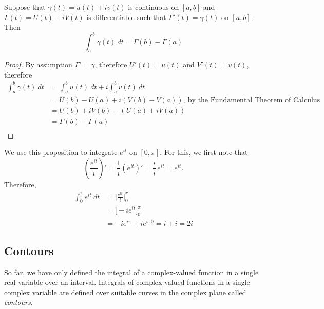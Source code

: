 \medskip

\begin{proposition}\label{pathftc}
Suppose that $\gamma(t) = u(t) + iv(t)$ is continuous on $[a,b]$ and $\Gamma(t) = U(t) + iV(t)$ is differentiable such that $\Gamma'(t) = \gamma(t)$ on $[a,b]$. Then
\[\int_a^b\gamma(t)\ dt = \Gamma(b) - \Gamma(a)\]
\end{proposition}
\begin{proof}
By assumption $\Gamma' = \gamma$, therefore $U'(t) = u(t)$ and $V'(t) = v(t)$, therefore
\begin{align*}
\int_a^b\gamma(t)\ dt &= \int_a^bu(t)\ dt + i\int_a^bv(t)\ dt\\[0.5em]
&= U(b) - U(a) + i(V(b) - V(a)),\ \text{by the Fundamental Theorem of Calculus}\\[0.5em]
&= U(b) + iV(b) - (U(a) + iV(a))\\[0.5em]
&= \Gamma(b) - \Gamma(a)\\[-2.5em]
\end{align*}
\end{proof}

\medskip

\begin{example}
We use this proposition to integrate $e^{it}$ on $[0,\pi]$. For this, we first note that
\[\left(\frac{e^{it}}{i}\right)' = \frac{1}{i}\left(e^{it}\right)' = \frac{i}{i}\,e^{it} = e^{it}.\]
Therefore, 
\begin{align*}
\int_0^\pi e^{it}\ dt &= \Bigg[\frac{e^{it}}{i}\Bigg]_0^\pi\\[0.5em]
&= \Big[-ie^{it}\Big]_0^\pi\\[0.5em]
&= -ie^{i\pi} + ie^{i\cdot 0} = i + i = 2i
\end{align*}
\end{example}

\bigskip

\subsection{Contours}

So far, we have only defined the integral of a complex-valued function in a single real variable over an interval. Integrals of complex-valued functions in a single complex variable are defined over suitable curves in the complex plane called \emph{contours}.

